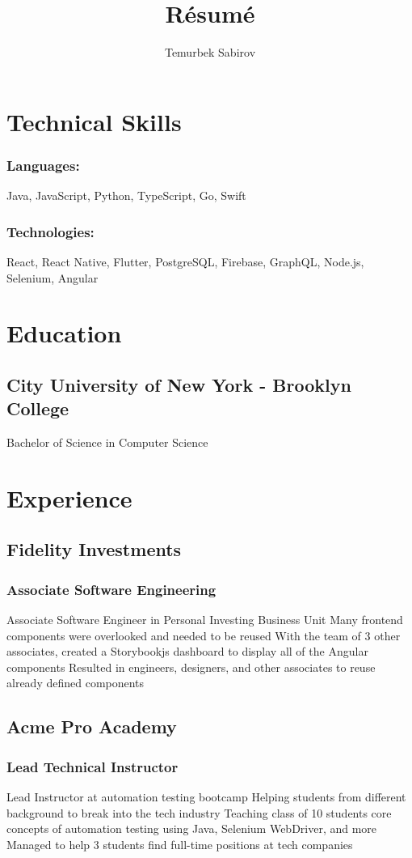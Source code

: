 \documentclass{article}
\begin{document}
\title{R\'esum\'e}
\author{Temurbek Sabirov}

\maketitle

\section{Technical Skills}
\subsubsection{Languages:}
Java, JavaScript, Python, TypeScript, Go, Swift
\subsubsection{Technologies:}
React, React Native, Flutter, PostgreSQL, Firebase, GraphQL, Node.js, Selenium, Angular
\section{Education}
\subsection{City University of New York - Brooklyn College}
Bachelor of Science in Computer Science
\section{Experience}
\subsection{Fidelity Investments}
\subsubsection{Associate Software Engineering}
Associate Software Engineer in Personal Investing Business Unit
Many frontend components were overlooked and needed to be reused
With the team of 3 other associates, created a Storybookjs dashboard to display all of the Angular components
Resulted in engineers, designers, and other associates to reuse already defined components
\subsection{Acme Pro Academy}
\subsubsection{Lead Technical Instructor}
Lead Instructor at automation testing bootcamp
Helping students from different background to break into the tech industry
Teaching class of 10 students core concepts of automation testing using Java, Selenium WebDriver, and more
Managed to help 3 students find full-time positions at tech companies
\end{document}
